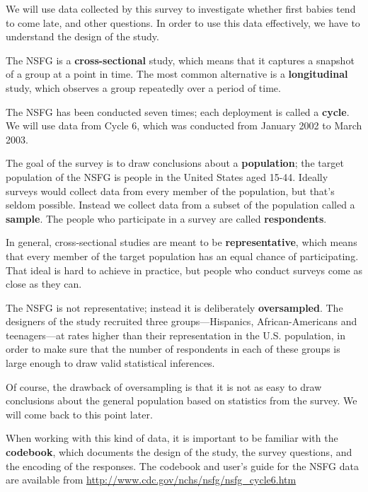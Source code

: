 \documentclass[12pt]{book}
\begin{document}
We will use data collected by this survey to investigate whether first
babies tend to come late, and other questions.  In order to use this
data effectively, we have to understand the design of the study.

The NSFG is a {\bf cross-sectional} study, which means that it
captures a snapshot of a group at a point in time.  The most
common alternative is a {\bf longitudinal} study, which observes a
group repeatedly over a period of time.

The NSFG has been conducted seven times; each deployment is called a
{\bf cycle}.  We will use data from Cycle 6, which was conducted from
January 2002 to March 2003.  

The goal of the survey is to draw conclusions about a {\bf
  population}; the target population of the NSFG is people in the
United States aged 15-44.  Ideally surveys would collect data from
every member of the population, but that's seldom possible.  Instead
we collect data from a subset of the population called a {\bf sample}.
The people who participate in a survey are called {\bf respondents}.

In general,
cross-sectional studies are meant to be {\bf representative}, which
means that every member of the target population has an equal chance
of participating.  That ideal is hard to achieve in
practice, but people who conduct surveys come as close as they can.
 

The NSFG is not representative; instead it is deliberately {\bf
  oversampled}.  The designers of the study recruited three
groups---Hispanics, African-Americans and teenagers---at rates higher
than their representation in the U.S. population, in order to
make sure that the number of respondents in each of
these groups is large enough to draw valid statistical inferences.

Of course, the drawback of oversampling is that it is not as easy
to draw conclusions about the general population based on statistics
from the survey.  We will come back to this point later.

When working with this kind of data, it is important to be familiar
with the {\bf codebook}, which documents the design of the study, the
survey questions, and the encoding of the responses.  The codebook and
user's guide for the NSFG data are available from
\url{http://www.cdc.gov/nchs/nsfg/nsfg_cycle6.htm}
\end{document}
